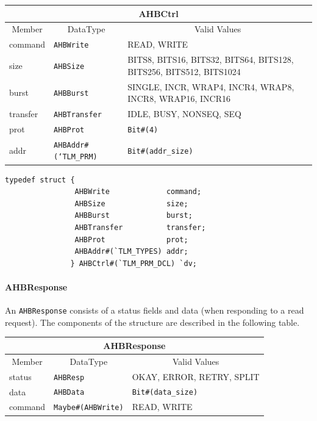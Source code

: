 \documentclass[twoside,letterpaper]{article}
\newcommand{\te}[1]{\texttt{#1}}
\begin{document}
\begin{center}
\begin{tabular}{|p{1 in}|p{1.8in}|p{3.2 in}|}
\hline
\multicolumn{3}{|c|}{AHBCtrl} \\
\hline
\multicolumn{1}{|c|}{Member}&\multicolumn{1}{|c|}{DataType}&\multicolumn{1}{|c|}{Valid Values} \\
\hline
\hline
command&\te{AHBWrite}&READ, WRITE\\
\hline
size&\te{AHBSize}&BITS8, BITS16, BITS32, BITS64, BITS128, BITS256,
BITS512, BITS1024\\
\hline
burst&\te{AHBBurst}&SINGLE, INCR, WRAP4, INCR4, WRAP8, INCR8, WRAP16,
INCR16\\
\hline
transfer&\te{AHBTransfer}&IDLE, BUSY, NONSEQ, SEQ\\
\hline
prot&\te{AHBProt}&\te{Bit\#(4)}\\
\hline
addr&\te{AHBAddr\#(`TLM\_PRM)}&\te{Bit\#(addr\_size)}\\
\hline
\end{tabular}
\end{center}

\begin{verbatim}
typedef struct {
                AHBWrite             command;
                AHBSize              size;
                AHBBurst             burst;   
                AHBTransfer          transfer;
                AHBProt              prot;   
                AHBAddr#(`TLM_TYPES) addr;
               } AHBCtrl#(`TLM_PRM_DCL) `dv;

\end{verbatim}



\paragraph{\bf AHBResponse} An \te{AHBResponse} consists of a status
                fields and data (when responding to a read request). 
                The components of the structure are described in the following table.


\begin{center}
\begin{tabular}{|p{1 in}|p{1.8in}|p{3.2 in}|}
\hline
\multicolumn{3}{|c|}{AHBResponse} \\
\hline
\multicolumn{1}{|c|}{Member}&\multicolumn{1}{|c|}{DataType}&\multicolumn{1}{|c|}{Valid Values} \\
\hline
\hline
status&\te{AHBResp}&OKAY, ERROR, RETRY, SPLIT\\
\hline
data&\te{AHBData}&\te{Bit\#(data\_size)}\\
\hline
command&\te{Maybe\#(AHBWrite)}&READ, WRITE\\
\hline
\end{tabular}
\end{center}
\end{document}
